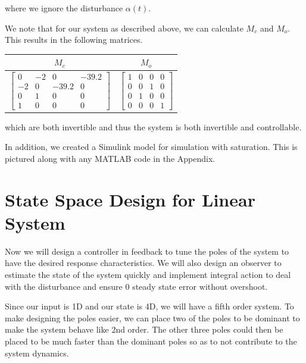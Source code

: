 \documentclass[12pt]{article}
\begin{document}
where we ignore the disturbance $\alpha(t)$.

We note that for our system as described above, we can calculate $M_c$ and $M_o$. This results in the following matrices.

\begin{center}
    \begin{tabular}{| c | c |}
        \hline
        $M_c$ & $M_o$ \\
        \hline
        $\begin{bmatrix}
            0 & -2 & 0 & -39.2 \\
            -2 & 0 & -39.2 & 0 \\
            0 & 1 & 0 & 0 \\
            1 & 0 & 0 & 0
        \end{bmatrix}$
        &
        $\begin{bmatrix}
            1 & 0 & 0 & 0 \\
            0 & 0 & 1 & 0 \\
            0 & 1 & 0 & 0 \\
            0 & 0 & 0 & 1
        \end{bmatrix}$ \\
        \hline
    \end{tabular}
\end{center}

which are both invertible and thus the system is both invertible and controllable.

In addition, we created a Simulink model for simulation with saturation. This is pictured along with any MATLAB code in the Appendix.

\section{State Space Design for Linear System}

Now we will design a controller in feedback to tune the poles of the system to have the desired response characteristics. We will also design an observer to estimate the state of the system quickly and implement integral action to deal with the disturbance and ensure 0 steady state error without overshoot.

Since our input is 1D and our state is 4D, we will have a fifth order system. To make designing the poles easier, we can place two of the poles to be dominant to make the system behave like 2nd order. The other three poles could then be placed to be much faster than the dominant poles so as to not contribute to the system dynamics.
\end{document}
